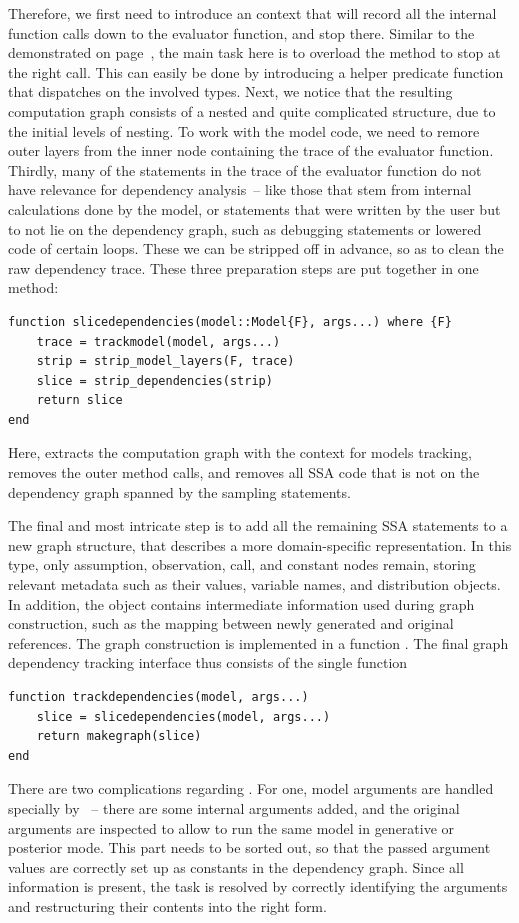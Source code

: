 Therefore, we first need to introduce an \irtrackerjl{} context that will record all the internal
function calls down to the evaluator function, and stop there.  Similar to the
 demonstrated on page~\pageref{lst:depthlimitcontext}, the main task here
is to overload the  method to stop at the right call.  This can easily be done by
introducing a helper predicate function  that dispatches on the involved types.
Next, we notice that the resulting computation graph consists of a nested and quite complicated
structure, due to the initial levels of nesting.  To work with the model code, we need to remore
outer layers from the inner node containing the trace of the evaluator function.  Thirdly, many of
the statements in the trace of the evaluator function do not have relevance for dependency
analysis~-- like those that stem from internal calculations done by the model, or statements that
were written by the user but to not lie on the dependency graph, such as debugging statements or
lowered code of certain loops.  These we can be stripped off in advance, so as to clean the raw
dependency trace.  These three preparation steps are put together in one method:
\begin{lstlisting}
function slicedependencies(model::Model{F}, args...) where {F}
    trace = trackmodel(model, args...)
    strip = strip_model_layers(F, trace)
    slice = strip_dependencies(strip)
    return slice
end
\end{lstlisting}
Here,  extracts the computation graph with the context for models tracking,
 removes the outer method calls, and  removes
all SSA code that is not on the dependency graph spanned by the sampling statements.

The final and most intricate step is to add all the remaining SSA statements to a new graph
structure, that describes a more domain-specific representation.  In this  type, only
assumption, observation, call, and constant nodes remain, storing relevant metadata such as their
values, variable names, and distribution objects.  In addition, the object contains intermediate
information used during graph construction, such as the mapping between newly generated and original
references.  The graph construction is implemented in a function .  The final
graph dependency tracking interface thus consists of the single function 
\begin{lstlisting}
function trackdependencies(model, args...)
    slice = slicedependencies(model, args...)
    return makegraph(slice)
end
\end{lstlisting}
There are two complications regarding .  For one, model arguments are handled
specially by \dppljl{}~-- there are some internal arguments added, and the original arguments are
inspected to allow to run the same model in generative or posterior mode.  This part needs to be
sorted out, so that the passed argument values are correctly set up as constants in the dependency
graph.  Since all information is present, the task is resolved by correctly identifying the
arguments and restructuring their contents into the right form.

